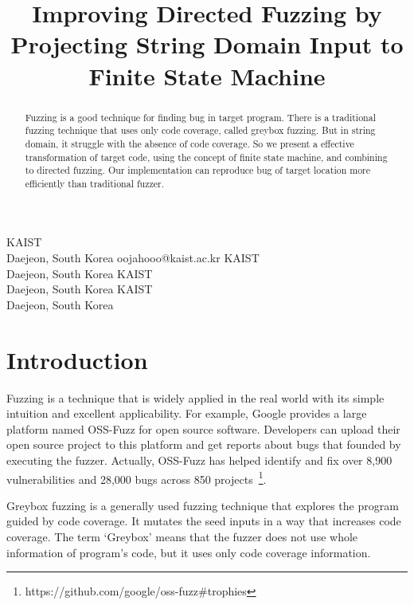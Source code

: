 \documentclass[12pt]{sigplanconf}
\begin{document}
\setlength{\pdfpageheight}{\paperheight}
\setlength{\pdfpagewidth}{\paperwidth}


\title{Improving Directed Fuzzing by Projecting String Domain Input to Finite State Machine}

{KAIST \\
    Daejeon, South Korea
}
{oojahooo@kaist.ac.kr}
{KAIST \\
    Daejeon, South Korea
}
{}
{KAIST \\
    Daejeon, South Korea
}
{}
{KAIST \\
    Daejeon, South Korea
}
{}

\maketitle

\begin{abstract}
    Fuzzing is a good technique for finding bug in target program. There is a
    traditional fuzzing technique that uses only code coverage, called greybox
    fuzzing. But in string domain, it struggle with the absence of code coverage.
    So we present a effective transformation of target code, using the concept of
    finite state machine, and combining to directed fuzzing. Our implementation
    can reproduce bug of target location more efficiently than traditional fuzzer.
\end{abstract}

\section{Introduction}
Fuzzing is a technique that is widely applied in the real world with its simple intuition and excellent applicability.
For example, Google provides a large platform named OSS-Fuzz for open source software. Developers can upload their open
source project to this platform and get reports about bugs that founded by executing the fuzzer. Actually, OSS-Fuzz has
helped identify and fix over 8,900 vulnerabilities and 28,000 bugs across 850 projects~\footnote{https://github.com/google/oss-fuzz\#trophies}.

Greybox fuzzing is a generally used fuzzing technique that explores the program guided by code coverage. It mutates the
seed inputs in a way that increases code coverage. The term `Greybox' means that the fuzzer does not use whole information
of program's code, but it uses only code coverage information.
\end{document}
